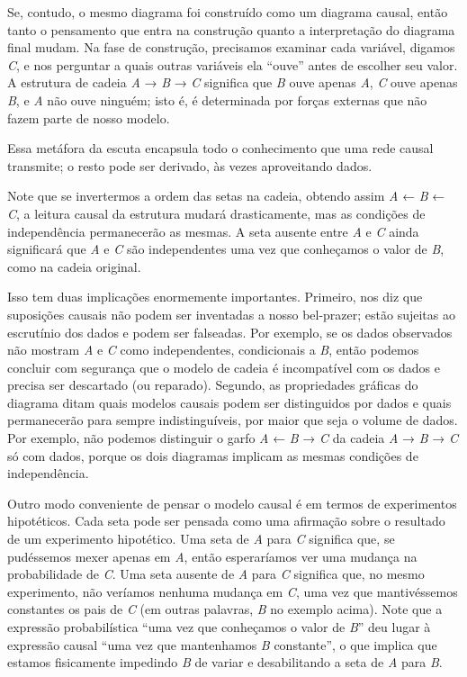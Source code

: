 \documentclass[11pt,a5paper,twoside]{book}
\begin{document}
Se, contudo, o mesmo diagrama foi construído como um diagrama causal, então tanto o pensamento que entra na construção quanto a interpretação do diagrama final mudam. Na fase de construção, precisamos examinar cada variável, digamos \textit{C}, e nos perguntar a quais outras variáveis ela “ouve” antes de escolher seu valor. A estrutura de cadeia \textit{A} → \textit{B} → \textit{C} significa que \textit{B} ouve apenas \textit{A}, \textit{C} ouve apenas \textit{B}, e \textit{A} não ouve ninguém; isto é, é determinada por forças externas que não fazem parte de nosso modelo.

Essa metáfora da escuta encapsula todo o conhecimento que uma rede causal transmite; o resto pode ser derivado, às vezes aproveitando dados.

Note que se invertermos a ordem das setas na cadeia, obtendo assim \textit{A} ← \textit{B} ← \textit{C}, a leitura causal da estrutura mudará drasticamente, mas as condições de independência permanecerão as mesmas. A seta ausente entre \textit{A} e \textit{C} ainda significará que \textit{A} e \textit{C} são independentes uma vez que conheçamos o valor de \textit{B}, como na cadeia original.

Isso tem duas implicações enormemente importantes. Primeiro, nos diz que suposições causais não podem ser inventadas a nosso bel-prazer; estão sujeitas ao escrutínio dos dados e podem ser falseadas. Por exemplo, se os dados observados não mostram \textit{A} e \textit{C} como independentes, condicionais a \textit{B}, então podemos concluir com segurança que o modelo de cadeia é incompatível com os dados e precisa ser descartado (ou reparado). Segundo, as propriedades gráficas do diagrama ditam quais modelos causais podem ser distinguidos por dados e quais permanecerão para sempre indistinguíveis, por maior que seja o volume de dados. Por exemplo, não podemos distinguir o garfo \textit{A} ← \textit{B} → \textit{C} da cadeia \textit{A} → \textit{B} → \textit{C} só com dados, porque os dois diagramas implicam as mesmas condições de independência.

Outro modo conveniente de pensar o modelo causal é em termos de experimentos hipotéticos. Cada seta pode ser pensada como uma afirmação sobre o resultado de um experimento hipotético. Uma seta de \textit{A} para \textit{C} significa que, se pudéssemos mexer apenas em \textit{A}, então esperaríamos ver uma mudança na probabilidade de \textit{C}. Uma seta ausente de \textit{A} para \textit{C} significa que, no mesmo experimento, não veríamos nenhuma mudança em \textit{C}, uma vez que mantivéssemos constantes os pais de \textit{C} (em outras palavras, \textit{B} no exemplo acima). Note que a expressão probabilística “uma vez que conheçamos o valor de \textit{B}” deu lugar à expressão causal “uma vez que mantenhamos \textit{B} constante”, o que implica que estamos fisicamente impedindo \textit{B} de variar e desabilitando a seta de \textit{A} para \textit{B}.
\end{document}
